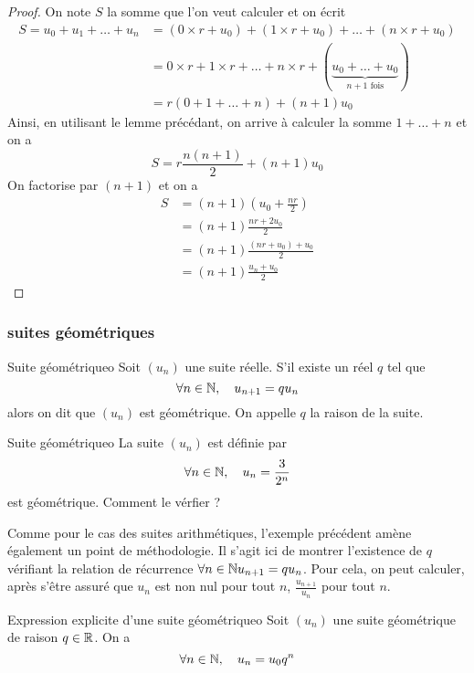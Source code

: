 \begin{proof}
On note $S$ la somme que l'on veut calculer et on écrit
\begin{align*}
	S=u_0+u_1+\dots+u_n &= (0\times r+u_0)+(1\times r+u_0)+\dots+(n\times r+u_0)\\
						&= 0\times r+1\times r+\dots+n\times r+(\underbrace{u_0+\dots+u_0}_{n+1\text{ fois}})\\
						&= r(0+1+\dots+n)+(n+1)u_0
\end{align*}
Ainsi, en utilisant le lemme précédant, on arrive à calculer la somme $1+\dots+n$ et on a 
\[S=r\frac{n(n+1)}2+(n+1)u_0\]
On factorise par $(n+1)$ et on a 
\begin{align*}
	S &= (n+1)\left(u_0+\frac{nr}2\right)\\
	  &= (n+1)\frac{nr+2u_0}2\\
	  &= (n+1)\frac{(nr+u_0)+u_0}2\\
	  &= (n+1)\frac{u_n+u_0}2
\end{align*}
\end{proof}

\subsubsection{suites géométriques}
\begin{definition}{Suite géométrique}{o}
	Soit $(u_n)$ une suite réelle. S'il existe un réel $q$ tel que \[\forall n\in\mathbb{N},\quad u_{n+1}=qu_n\]
	alors on dit que $(u_n)$ est géométrique. On appelle $q$ la raison de la suite.
\end{definition}

\begin{exemple}{Suite géométrique}{o}
La suite $(u_n)$ est définie par \[\forall n\in\mathbb{N},\quad u_n=\frac3{2^n}\]
est géométrique. Comment le vérfier ?
\end{exemple}
Comme pour le cas des suites arithmétiques, l’exemple précédent amène également un point de méthodologie. Il s'agit ici de montrer l’existence de $q$ vérifiant la relation de récurrence $\forall n\in\mathbb{N} u_{n+1} = qu_n$. Pour cela, on peut calculer, après s'être assuré que $u_n$ est non nul pour tout $n$, $\frac{u_{n+1}}{u_n}$ pour tout $n$.


\begin{proposition}{Expression explicite d'une suite géométrique}{o}
	Soit $(u_n)$ une suite géométrique de raison $q\in\mathbb{R}$. On a \[\forall n\in\mathbb{N},\quad u_n=u_0q^n\]
\end{proposition}

